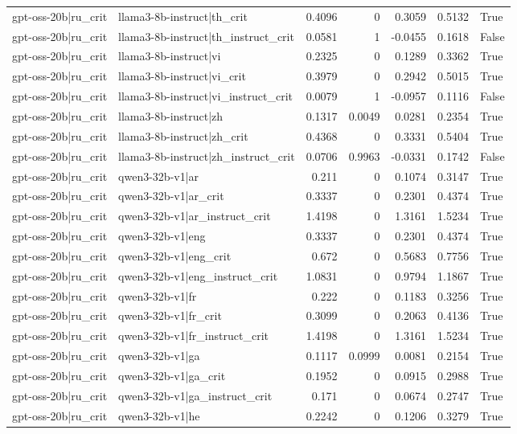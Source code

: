 \begin{table}
\begin{tabular}{l l r r r r l}
gpt-oss-20b|ru_crit & llama3-8b-instruct|th_crit & 0.4096 & 0 & 0.3059 & 0.5132 & True \\
gpt-oss-20b|ru_crit & llama3-8b-instruct|th_instruct_crit & 0.0581 & 1 & -0.0455 & 0.1618 & False \\
gpt-oss-20b|ru_crit & llama3-8b-instruct|vi & 0.2325 & 0 & 0.1289 & 0.3362 & True \\
gpt-oss-20b|ru_crit & llama3-8b-instruct|vi_crit & 0.3979 & 0 & 0.2942 & 0.5015 & True \\
gpt-oss-20b|ru_crit & llama3-8b-instruct|vi_instruct_crit & 0.0079 & 1 & -0.0957 & 0.1116 & False \\
gpt-oss-20b|ru_crit & llama3-8b-instruct|zh & 0.1317 & 0.0049 & 0.0281 & 0.2354 & True \\
gpt-oss-20b|ru_crit & llama3-8b-instruct|zh_crit & 0.4368 & 0 & 0.3331 & 0.5404 & True \\
gpt-oss-20b|ru_crit & llama3-8b-instruct|zh_instruct_crit & 0.0706 & 0.9963 & -0.0331 & 0.1742 & False \\
gpt-oss-20b|ru_crit & qwen3-32b-v1|ar & 0.211 & 0 & 0.1074 & 0.3147 & True \\
gpt-oss-20b|ru_crit & qwen3-32b-v1|ar_crit & 0.3337 & 0 & 0.2301 & 0.4374 & True \\
gpt-oss-20b|ru_crit & qwen3-32b-v1|ar_instruct_crit & 1.4198 & 0 & 1.3161 & 1.5234 & True \\
gpt-oss-20b|ru_crit & qwen3-32b-v1|eng & 0.3337 & 0 & 0.2301 & 0.4374 & True \\
gpt-oss-20b|ru_crit & qwen3-32b-v1|eng_crit & 0.672 & 0 & 0.5683 & 0.7756 & True \\
gpt-oss-20b|ru_crit & qwen3-32b-v1|eng_instruct_crit & 1.0831 & 0 & 0.9794 & 1.1867 & True \\
gpt-oss-20b|ru_crit & qwen3-32b-v1|fr & 0.222 & 0 & 0.1183 & 0.3256 & True \\
gpt-oss-20b|ru_crit & qwen3-32b-v1|fr_crit & 0.3099 & 0 & 0.2063 & 0.4136 & True \\
gpt-oss-20b|ru_crit & qwen3-32b-v1|fr_instruct_crit & 1.4198 & 0 & 1.3161 & 1.5234 & True \\
gpt-oss-20b|ru_crit & qwen3-32b-v1|ga & 0.1117 & 0.0999 & 0.0081 & 0.2154 & True \\
gpt-oss-20b|ru_crit & qwen3-32b-v1|ga_crit & 0.1952 & 0 & 0.0915 & 0.2988 & True \\
gpt-oss-20b|ru_crit & qwen3-32b-v1|ga_instruct_crit & 0.171 & 0 & 0.0674 & 0.2747 & True \\
gpt-oss-20b|ru_crit & qwen3-32b-v1|he & 0.2242 & 0 & 0.1206 & 0.3279 & True \\

\end{tabular}
\end{table}
